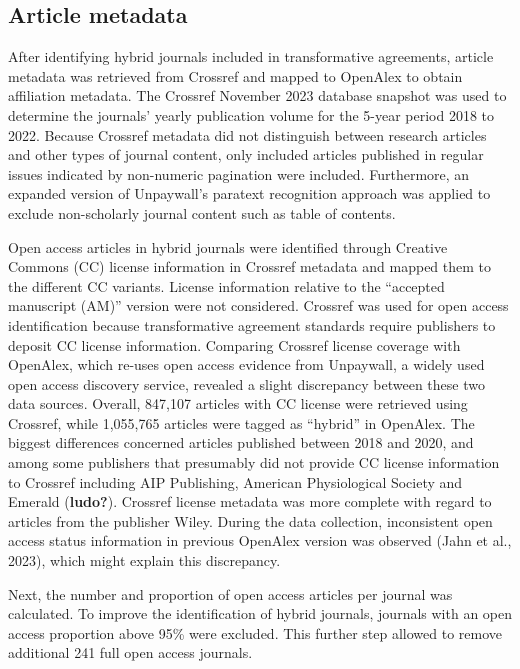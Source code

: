 \documentclass[a4paper,man,floatsintext,longtable,noextraspace,12pt]{apa6}
\begin{document}
\hypertarget{article-metadata}{%
\subsection{Article metadata}\label{article-metadata}}

After identifying hybrid journals included in transformative agreements,
article metadata was retrieved from Crossref and mapped to OpenAlex to
obtain affiliation metadata. The Crossref November 2023 database
snapshot was used to determine the journals' yearly publication volume
for the 5-year period 2018 to 2022. Because Crossref metadata did not
distinguish between research articles and other types of journal
content, only included articles published in regular issues indicated by
non-numeric pagination were included. Furthermore, an expanded version
of Unpaywall's paratext recognition approach was applied to exclude
non-scholarly journal content such as table of contents.

Open access articles in hybrid journals were identified through Creative
Commons (CC) license information in Crossref metadata and mapped them to
the different CC variants. License information relative to the
``accepted manuscript (AM)'' version were not considered. Crossref was
used for open access identification because transformative agreement
standards require publishers to deposit CC license information.
Comparing Crossref license coverage with OpenAlex, which re-uses open
access evidence from Unpaywall, a widely used open access discovery
service, revealed a slight discrepancy between these two data sources.
Overall, 847,107 articles with CC license were retrieved using Crossref,
while 1,055,765 articles were tagged as ``hybrid'' in OpenAlex. The
biggest differences concerned articles published between 2018 and 2020,
and among some publishers that presumably did not provide CC license
information to Crossref including AIP Publishing, American Physiological
Society and Emerald (\textbf{ludo?}). Crossref license metadata was more
complete with regard to articles from the publisher Wiley. During the
data collection, inconsistent open access status information in previous
OpenAlex version was observed (Jahn et al., 2023), which might explain
this discrepancy.

Next, the number and proportion of open access articles per journal was
calculated. To improve the identification of hybrid journals, journals
with an open access proportion above 95\% were excluded. This further
step allowed to remove additional 241 full open access journals.
\end{document}
